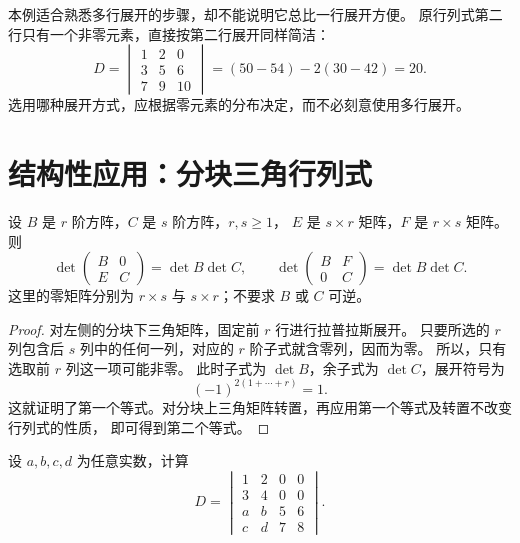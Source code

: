 \documentclass[UTF8,12pt,a4paper,fontset=fandol]{ctexart}
\begin{document}
本例适合熟悉多行展开的步骤，却不能说明它总比一行展开方便。
原行列式第二行只有一个非零元素，直接按第二行展开同样简洁：
\[
  D=\begin{vmatrix}1&2&0\\3&5&6\\7&9&10\end{vmatrix}
  =(50-54)-2(30-42)=20.
\]
选用哪种展开方式，应根据零元素的分布决定，而不必刻意使用多行展开。

\section{结构性应用：分块三角行列式}

\begin{proposition}[分块三角矩阵的行列式]
\label{prop:laplace-block-triangular}
设 $B$ 是 $r$ 阶方阵，$C$ 是 $s$ 阶方阵，$r,s\geq1$，
$E$ 是 $s\times r$ 矩阵，$F$ 是 $r\times s$ 矩阵。则
\begin{equation}
  \det\begin{pmatrix}B&0\\E&C\end{pmatrix}
  =\det B\det C,
  \qquad
  \det\begin{pmatrix}B&F\\0&C\end{pmatrix}
  =\det B\det C.
  \label{eq:laplace-block-triangular}
\end{equation}
这里的零矩阵分别为 $r\times s$ 与 $s\times r$；不要求 $B$ 或 $C$ 可逆。
\end{proposition}

\begin{proof}
对左侧的分块下三角矩阵，固定前 $r$ 行进行拉普拉斯展开。
只要所选的 $r$ 列包含后 $s$ 列中的任何一列，对应的 $r$ 阶子式就含零列，因而为零。
所以，只有选取前 $r$ 列这一项可能非零。
此时子式为 $\det B$，余子式为 $\det C$，展开符号为
\[
  (-1)^{2(1+\cdots+r)}=1.
\]
这就证明了第一个等式。对分块上三角矩阵转置，再应用第一个等式及转置不改变行列式的性质，
即可得到第二个等式。
\end{proof}

\begin{example}[含任意参数的行列式]
设 $a,b,c,d$ 为任意实数，计算
\[
  D=\begin{vmatrix}
    1&2&0&0\\
    3&4&0&0\\
    a&b&5&6\\
    c&d&7&8
  \end{vmatrix}.
\]
\end{example}
\end{document}
